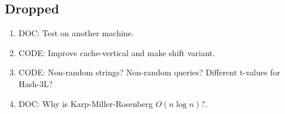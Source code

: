 \documentclass[a4]{article}
\begin{document}
\ifarticle
{}
\fi %

\subsection*{Dropped}
\begin{enumerate}
\item DOC: Test on another machine.
\item CODE: Improve cache-vertical and make shift variant.
\item CODE: Non-random strings? Non-random queries? Different t-values for Hash-3L?
\item DOC: Why is Karp-Miller-Rosenberg $O(n\log n)$?.
\end{enumerate}

\listoffixmes

\fi %
\end{document}
